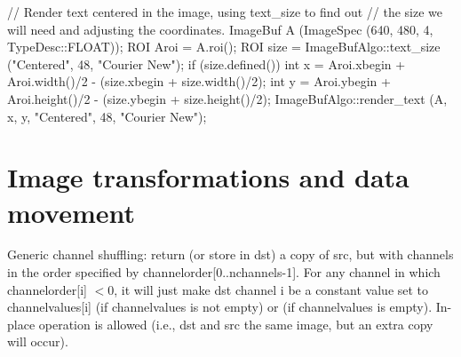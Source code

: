 \begin{code}
    // Render text centered in the image, using text_size to find out
    // the size we will need and adjusting the coordinates.
    ImageBuf A (ImageSpec (640, 480, 4, TypeDesc::FLOAT));
    ROI Aroi = A.roi();
    ROI size = ImageBufAlgo::text_size ("Centered", 48, "Courier New");
    if (size.defined()) {
        int x = Aroi.xbegin + Aroi.width()/2  - (size.xbegin + size.width()/2);
        int y = Aroi.ybegin + Aroi.height()/2 - (size.ybegin + size.height()/2);
        ImageBufAlgo::render_text (A, x, y, "Centered", 48, "Courier New");
    }
\end{code}
\apiend



\newpage

\section{Image transformations and data movement}
\label{sec:iba:transforms}

  \label{sec:iba:channels}

Generic channel shuffling: return (or store in {\cf dst}) a copy of
{\cf src}, but with channels in the order specified by
{\cf channelorder[0..nchannels-1]}. For any channel in which
{\cf channelorder[i]} $< 0$, it will just make {\cf dst} channel {\cf i} be
a constant value set to {\cf channelvalues[i]} (if {\cf channelvalues} is
not empty) or {} (if {\cf channelvalues} is empty). In-place
operation is allowed (i.e., dst and src the same image, but an extra copy
will occur).

